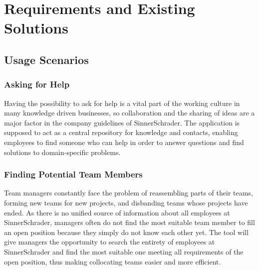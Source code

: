 \chapter{Requirements and Existing Solutions}

\section{Usage Scenarios}
\label{usecases}
\subsection{Asking for Help}
Having the possibility to ask for help is a vital part of the working culture in many knowledge driven
businesses, so collaboration and the sharing of ideas are a major factor in the company guidelines
of SinnerSchrader. The application is supposed to act as a central repository for knowledge and contacts,
enabling employees to find someone who can help in order to answer questions and find solutions to domain-specific problems.

\subsection{Finding Potential Team Members}
Team managers constantly face the problem of reassembling parts of their teams, forming new teams for new projects, and
disbanding teams whose projects have ended. As there is no unified source of information about all employees at SinnerSchrader, managers often
do not find the most suitable team member to fill an open position because they simply do not know each other yet.
The tool will give managers the opportunity to search the entirety of employees at SinnerSchrader and find the most suitable one
meeting all requirements of the open position, thus making collocating teams easier and more efficient.

\newpage

